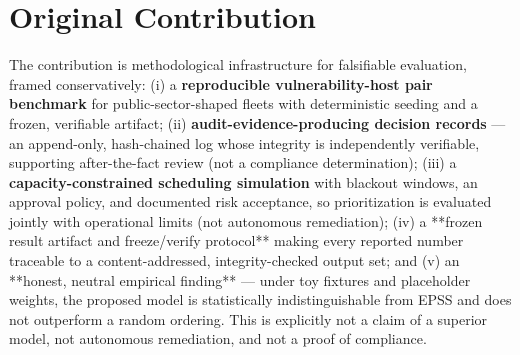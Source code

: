 \section{Original Contribution}

The contribution is methodological infrastructure for falsifiable evaluation,
framed conservatively: (i) a \textbf{reproducible vulnerability-host pair benchmark} for
public-sector-shaped fleets with deterministic seeding and a frozen, verifiable
artifact; (ii) \textbf{audit-evidence-producing decision records} --- an append-only,
hash-chained log whose integrity is independently verifiable, supporting
after-the-fact review (not a compliance determination); (iii) a
\textbf{capacity-constrained scheduling simulation} with blackout windows, an approval
policy, and documented risk acceptance, so prioritization is evaluated jointly with
operational limits (not autonomous remediation); (iv) a **frozen result artifact
and freeze/verify protocol** making every reported number traceable to a
content-addressed, integrity-checked output set; and (v) an **honest, neutral
empirical finding** --- under toy fixtures and placeholder weights, the proposed model
is statistically indistinguishable from EPSS and does not outperform a random
ordering. This is explicitly not a claim of a superior model, not autonomous
remediation, and not a proof of compliance.
